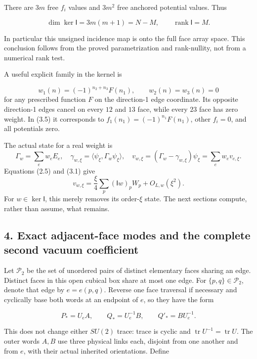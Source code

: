 \documentclass[
  11pt,
]{article}
\begin{document}
There are \(3m\) free \(f_i\) values and \(3m^2\) free anchored
potential values. Thus

\[
\boxed{\dim\ker\mathsf I=3m(m+1)=N-M,\qquad
\operatorname{rank}\mathsf I=M.}
\tag{3.9}
\]

In particular this unsigned incidence map is onto the full face array
space. This conclusion follows from the proved parametrization and
rank-nullity, not from a numerical rank test.

A useful explicit family in the kernel is

\[
w_1(n)=(-1)^{n_2+n_3}F(n_1),\qquad w_2(n)=w_3(n)=0
\tag{3.10}
\] for any prescribed function \(F\) on the direction-1 edge coordinate.
Its opposite direction-1 edges cancel on every \(12\) and \(13\) face,
while every \(23\) face has zero weight. In (3.5) it corresponds to
\(f_1(n_1)=(-1)^{n_1}F(n_1)\), other \(f_i=0\), and all potentials zero.

The actual state for a real weight is \[
\Gamma_w=\sum_ew_eE_e,\quad
\gamma_{w,\xi}=\langle\psi_\xi,\Gamma_w\psi_\xi\rangle,\quad
v_{w,\xi}=(\Gamma_w-\gamma_{w,\xi})\psi_\xi=\sum_ew_ev_{e,\xi}.
\tag{3.11}
\] Equations (2.5) and (3.1) give \[
v_{w,\xi}=\frac{\xi}{4}\sum_p(\mathsf Iw)_pW_p+O_{L,w}(\xi^2).
\tag{3.12}
\] For \(w\in\ker\mathsf I\), this merely removes its order-\(\xi\)
state. The next sections compute, rather than assume, what remains.

\subsection{4. Exact adjacent-face modes and the complete second vacuum
coefficient}\label{magnetic-part-4-exact-adjacent-face-modes-and-the-complete-second-vacuum-coefficient}

Let \(\mathscr P_2\) be the set of unordered pairs of distinct
elementary faces sharing an edge. Distinct faces in this open cubical
box share at most one edge. For \(\{p,q\}\in\mathscr P_2\), denote that
edge by \(e=e(p,q)\). Reverse one face traversal if necessary and
cyclically base both words at an endpoint of \(e\), so they have the
form

\[
P_*=U_eA,\qquad Q_*=U_e^{-1}B,\qquad Q'_*=BU_e^{-1}.
\tag{4.1}
\]

This does not change either \(SU(2)\) trace: trace is cyclic and
\(\operatorname{tr}U^{-1}=\operatorname{tr}U\). The outer words \(A,B\)
use three physical links each, disjoint from one another and from \(e\),
with their actual inherited orientations. Define
\end{document}
